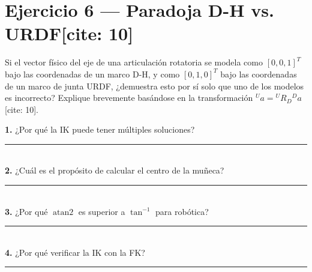 \documentclass[11pt, a4paper]{article}
\begin{document}
\section*{Ejercicio 6 — Paradoja D-H vs. URDF[cite: 10]}
Si el vector físico del eje de una articulación rotatoria se modela como $[0, 0, 1]^T$ bajo las coordenadas de un marco D-H, y como $[0, 1, 0]^T$ bajo las coordenadas de un marco de junta URDF, ¿demuestra esto por sí solo que uno de los modelos es incorrecto? Explique brevemente basándose en la transformación ${}^Ua = {}^UR_D{}^Da$[cite: 10].
\vspace{3cm}

\begin{tcolorbox}[colback=gray!5, colframe=gray!50, title=\textbf{Exit Check de Consolidación[cite: 10]}]
    \small
    \textbf{1.} ¿Por qué la IK puede tener múltiples soluciones? \rule{6cm}{0.15mm} \\
    \textbf{2.} ¿Cuál es el propósito de calcular el centro de la muñeca? \rule{6cm}{0.15mm} \\
    \textbf{3.} ¿Por qué $\operatorname{atan2}$ es superior a $\tan^{-1}$ para robótica? \rule{6cm}{0.15mm} \\
    \textbf{4.} ¿Por qué verificar la IK con la FK? \rule{6cm}{0.15mm}
\end{tcolorbox}
\end{document}

